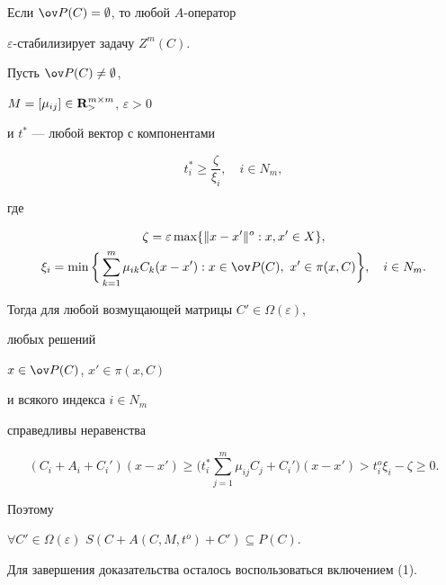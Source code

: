 \begin{pf}


Если $\ov P(C)=\emptyset$, то любой $A$-оператор


$\varepsilon$-стабилизирует задачу $Z^m(C)$.





Пусть $\ov P(C)\ne\emptyset$,


$M=[\mu_{ij}]\in {\bold R}_>^{m\times m}$, $\varepsilon >0$


и $t^*$ --- любой вектор с компонентами


\begin{equation}


t^*_i \ge \frac{\zeta}{\xi_i},\quad i\in N_m,


\end{equation}


где


\begin{gather*}


\zeta=\varepsilon\max\{\| x -x'\|^o: x, x'\in X\}, \\


%


\xi_i=\min \bigg\{\sum_{k=1}^m\mu_{ik}C_k(x- x'):


x\in \ov P(C),\ x' \in \pi(x, C)\bigg\},\quad i\in N_m.


\end{gather*}


Тогда для любой возмущающей матрицы $C'\in\Omega(\varepsilon)$,


любых решений


$x\in \ov P(C)$, $x'\in \pi(x, C)$


и всякого индекса $i\in N_m$


справедливы неравенства


$$


(C_i+A_i+C_i')(x-x')\ge


\bigg(t_i^*\sum_{j=1}^m\mu_{ij}C_j+C_i'\bigg)(x-x')>


t^o_i\xi_i-\zeta \ge 0.


$$


Поэтому


$\forall C'\in\Omega(\varepsilon)$\; $S(C+A(C, M, t^o)+C') \subseteq P(C)$.


Для завершения доказательства осталось воспользоваться включением (1).


\end{pf}





